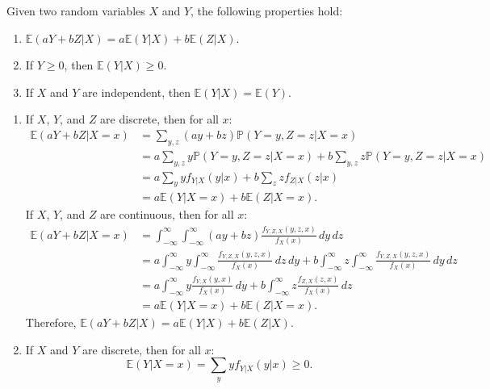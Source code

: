 \documentclass{huhtakm-template-book-v2}
\newcommand{\prob}{\mathbb{P}}
\newcommand{\expect}{\mathbb{E}}
\begin{document}
    \begin{lem}
        Given two random variables $X$ and $Y$, the following properties hold:
        \begin{enumerate}
            \item $\expect(aY+bZ|X) = a\expect(Y|X)+b\expect(Z|X)$.
            \item If $Y \geq 0$, then $\expect(Y|X) \geq 0$.
            \item If $X$ and $Y$ are independent, then $\expect(Y|X) = \expect(Y)$.
        \end{enumerate}
    \end{lem}
    \begin{proofing}
        \begin{enumerate}
            \item If $X$, $Y$, and $Z$ are discrete, then for all $x$:
            \begin{align*}
                \expect(aY+bZ|X = x) &= \sum_{y,z}(ay+bz)\prob(Y = y,Z = z|X = x)\\
                &= a\sum_{y,z}y\prob(Y = y,Z = z|X = x)+b\sum_{y,z}z\prob(Y = y,Z = z|X = x)\\
                &= a\sum_{y}yf_{Y|X}(y|x)+b\sum_{z}zf_{Z|X}(z|x)\\
                &= a\expect(Y|X = x)+b\expect(Z|X = x).
            \end{align*}
            If $X$, $Y$, and $Z$ are continuous, then for all $x$:
            \begin{align*}
                \expect(aY+bZ|X = x) &= \int_{-\infty}^{\infty}\int_{-\infty}^{\infty}(ay+bz)\frac{f_{Y,Z,X}(y,z,x)}{f_{X}(x)}\,dy\,dz\\
                &= a\int_{-\infty}^{\infty} y\int_{-\infty}^{\infty}\frac{f_{Y,Z,X}(y,z,x)}{f_{X}(x)}\,dz\,dy+b\int_{-\infty}^{\infty} z\int_{-\infty}^{\infty}\frac{f_{Y,Z,X}(y,z,x)}{f_{X}(x)}\,dy\,dz\\
                &= a\int_{-\infty}^{\infty} y\frac{f_{Y,X}(y,x)}{f_{X}(x)}\,dy+b\int_{-\infty}^{\infty} z\frac{f_{Z,X}(z,x)}{f_{X}(x)}\,dz\\
                &= a\expect(Y|X = x)+b\expect(Z|X = x).
            \end{align*}
            Therefore, $\expect(aY+bZ|X) = a\expect(Y|X)+b\expect(Z|X)$.
            \item If $X$ and $Y$ are discrete, then for all $x$:
            \begin{equation*}
                \expect(Y|X = x) = \sum_{y}yf_{Y|X}(y|x) \geq 0.

\end{equation*}
\end{enumerate}
\end{proofing}
\end{document}
